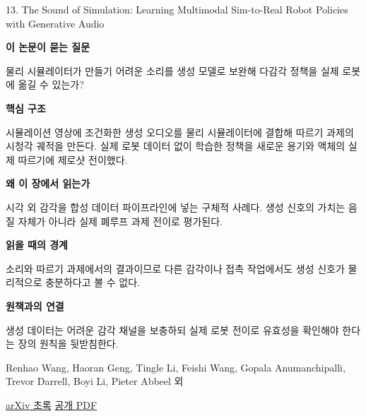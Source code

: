 \documentclass[11pt,openany]{book}
\begin{document}
\begin{termcard}{13. The Sound of Simulation: Learning Multimodal Sim-to-Real Robot Policies with Generative Audio}

\par

\medskip

{\sffamily\bfseries\color{deepblue} 이 논문이 묻는 질문}\par

물리 시뮬레이터가 만들기 어려운 소리를 생성 모델로 보완해 다감각 정책을 실제 로봇에 옮길 수 있는가?

\smallskip

{\sffamily\bfseries\color{deepblue} 핵심 구조}\par

시뮬레이션 영상에 조건화한 생성 오디오를 물리 시뮬레이터에 결합해 따르기 과제의 시청각 궤적을 만든다. 실제 로봇 데이터 없이 학습한 정책을 새로운 용기와 액체의 실제 따르기에 제로샷 전이했다.

\smallskip

{\sffamily\bfseries\color{deepblue} 왜 이 장에서 읽는가}\par

시각 외 감각을 합성 데이터 파이프라인에 넣는 구체적 사례다. 생성 신호의 가치는 음질 자체가 아니라 실제 폐루프 과제 전이로 평가된다.

\smallskip

{\sffamily\bfseries\color{coral} 읽을 때의 경계}\par

소리와 따르기 과제에서의 결과이므로 다른 감각이나 접촉 작업에서도 생성 신호가 물리적으로 충분하다고 볼 수 없다.

\smallskip

{\sffamily\bfseries\color{teal} 원책과의 연결}\par

생성 데이터는 어려운 감각 채널을 보충하되 실제 로봇 전이로 유효성을 확인해야 한다는 장의 원칙을 뒷받침한다.

\medskip

{\footnotesize\color{muted} Renhao Wang, Haoran Geng, Tingle Li, Feishi Wang, Gopala Anumanchipalli, Trevor Darrell, Boyi Li, Pieter Abbeel 외\par

\href{https://arxiv.org/abs/2507.02864}{arXiv 초록} \quad \href{https://arxiv.org/pdf/2507.02864}{공개 PDF}\par}

\end{termcard}
\end{document}
